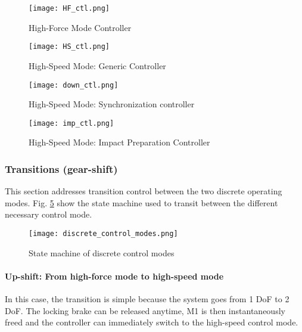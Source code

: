  
\begin{figure}[p]
	\centering
		\texttt{[image: HF\_ctl.png]}
	\caption{High-Force Mode Controller}
	\label{fig:HF_loop}
\end{figure}

\begin{figure}[p]
	\centering
		\texttt{[image: HS\_ctl.png]}
	\caption{High-Speed Mode: Generic Controller}
	\label{fig:HS_loop}
\end{figure}

\begin{figure}[p]
	\centering
		\texttt{[image: down\_ctl.png]}
	\caption{High-Speed Mode: Synchronization controller}
	\label{fig:down_loop}
\end{figure}

\begin{figure}[p]
	\centering
		\texttt{[image: imp\_ctl.png]}
	\caption{High-Speed Mode: Impact Preparation Controller}
	\label{fig:imp_loop}
\end{figure}





\subsubsection{Transitions (gear-shift)}

This section addresses transition control between the two discrete operating modes. Fig. \ref{fig:automaticflow} show the state machine used to transit between the different necessary control mode.

\begin{figure}[H]
	\centering
		\texttt{[image: discrete\_control\_modes.png]}
	\caption{State machine of discrete control modes}
	\label{fig:automaticflow}
\end{figure}


\paragraph{Up-shift: From high-force mode to high-speed mode}
In this case, the transition is simple because the system goes from 1 DoF to 2 DoF. The locking brake can be released anytime, M1 is then instantaneously freed and the controller can immediately switch to the high-speed control mode.
%

